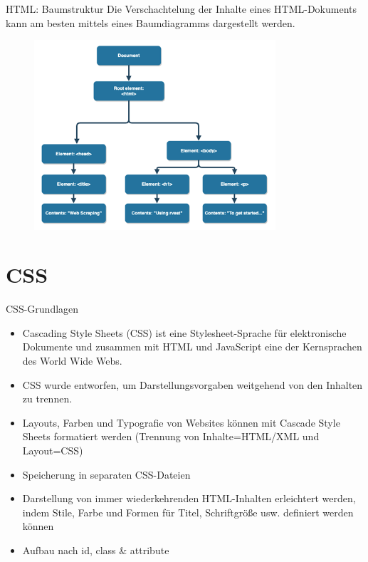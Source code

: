 \documentclass[xcolor=dvipsnames]{beamer}\usepackage[]{graphicx}\usepackage[]{color}
\begin{document}
\begin{frame}{HTML: Baumstruktur}
Die Verschachtelung der Inhalte eines HTML-Dokuments kann am besten mittels eines Baumdiagramms dargestellt werden. 
\begin{figure}
  	\centering
  	\includegraphics[width=0.8\textwidth]{figure/HTMLtree.png}
  \end{figure}
\end{frame}


\section{CSS}

\begin{frame}{CSS-Grundlagen}
\begin{itemize}
\item Cascading Style Sheets (CSS) ist eine Stylesheet-Sprache für elektronische Dokumente und zusammen mit HTML und JavaScript eine der Kernsprachen des World Wide Webs.
\item CSS wurde entworfen, um Darstellungsvorgaben weitgehend von den Inhalten zu trennen.
\item Layouts, Farben und Typografie von Websites können mit Cascade Style Sheets formatiert
werden (Trennung von Inhalte=HTML/XML und Layout=CSS)
\item Speicherung in separaten CSS-Dateien
\item Darstellung von immer wiederkehrenden HTML-Inhalten erleichtert werden, indem Stile, Farbe und Formen für Titel, Schriftgröße usw. definiert werden können
\item Aufbau nach id, class \& attribute
\end{itemize}
\end{frame}
\end{document}
